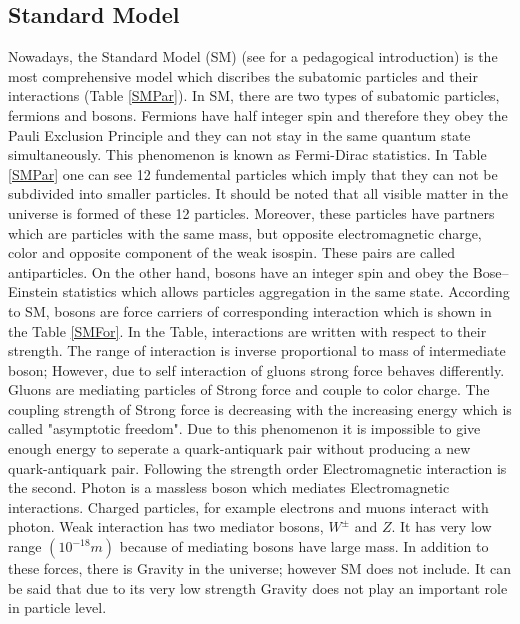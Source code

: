 \documentclass[12pt,oneandhalf,chaparabic,phys,ms,eng]{metu}
\begin{document}
\subsection{Standard Model}
Nowadays, the Standard Model (SM) (see \cite{R32} for a pedagogical introduction) is the most comprehensive model which discribes the subatomic particles and their interactions (Table \ref{SMPar}). In SM, there are two types of subatomic particles, fermions and bosons. Fermions have half integer spin and therefore they obey the  Pauli Exclusion Principle and they can not stay in the same quantum state simultaneously. This phenomenon is known as Fermi-Dirac statistics. In Table \ref{SMPar} one can see 12 fundemental particles which imply that they can not be subdivided into smaller particles. It should be noted that all visible matter in the universe is formed of these 12 particles. Moreover, these particles have partners which are particles with the same mass, but opposite electromagnetic charge, color and opposite component of the weak isospin. These pairs are called antiparticles.
On the other hand, bosons have an integer spin and obey the Bose–Einstein statistics which allows particles aggregation in the same state. According to SM, bosons are force carriers of corresponding interaction which is shown in the Table \ref{SMFor}. In the Table, interactions are written with respect to their strength.  The range of interaction is inverse proportional to mass of intermediate boson; However, due to self interaction of gluons strong force behaves differently. Gluons are mediating particles of Strong force and couple to color charge. The coupling strength of Strong force is decreasing with the increasing energy which is called "asymptotic freedom". Due to this phenomenon it is impossible to give enough energy to seperate a quark-antiquark pair without producing a new quark-antiquark pair. Following the strength order Electromagnetic interaction is the second. Photon is a massless boson which mediates Electromagnetic interactions. Charged particles, for example electrons and muons interact with photon. Weak interaction has two mediator bosons, $W^{\pm}$ and $Z$. It has very low range $(10^{-18} m)$ because of mediating bosons have large mass. In addition to these forces, there is Gravity in the universe; however SM does not include. It can be said that due to its very low strength Gravity does not play an important role in particle level. 

\end{document}
